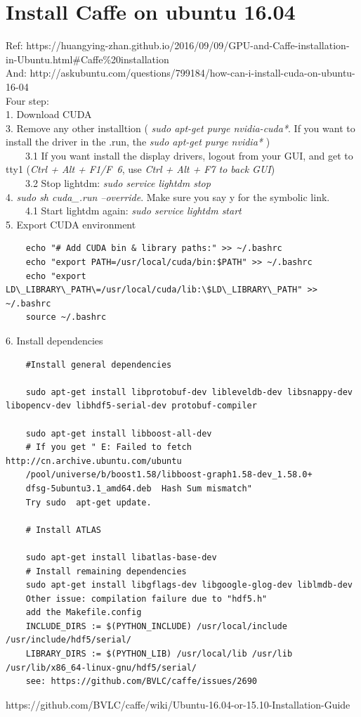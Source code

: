 \documentclass[a4paper, 12pt]{article}
\begin{document}
    \section{Install Caffe on ubuntu 16.04}
    Ref: https://huangying-zhan.github.io/2016/09/09/GPU-and-Caffe-installation-in-Ubuntu.html#Caffe\%20installation\\
    And: http://askubuntu.com/questions/799184/how-can-i-install-cuda-on-ubuntu-16-04\\
    Four step:\\
    1. Download CUDA\\
    3. Remove any other installtion ( \textit{sudo apt-get purge nvidia-cuda*}. If you want to install the driver in the .run, the \textit{sudo apt-get purge nvidia*} )\\
    ~~~~3.1 If you want install the display drivers, logout from your GUI, and get to tty1 (\textit{Ctrl + Alt + F1/F~6}, use \textit{Ctrl + Alt + F7 to back GUI})\\
    ~~~~3.2 Stop lightdm: \textit{sudo service lightdm stop}\\
    4. \textit{sudo sh cuda\_.run --override}. Make sure you say y for the symbolic link.\\
    ~~~~4.1 Start lightdm again: \textit{sudo service lightdm start}\\
    5. Export CUDA environment\\
    \begin{verbatim}
	echo "# Add CUDA bin & library paths:" >> ~/.bashrc
	echo "export PATH=/usr/local/cuda/bin:$PATH" >> ~/.bashrc
	echo "export LD\_LIBRARY\_PATH\=/usr/local/cuda/lib:\$LD\_LIBRARY\_PATH" >> ~/.bashrc
	source ~/.bashrc
    \end{verbatim}
    6. Install dependencies\\
    \begin{verbatim}
    #Install general dependencies

    sudo apt-get install libprotobuf-dev libleveldb-dev libsnappy-dev libopencv-dev libhdf5-serial-dev protobuf-compiler

    sudo apt-get install libboost-all-dev
    # If you get " E: Failed to fetch http://cn.archive.ubuntu.com/ubuntu
    /pool/universe/b/boost1.58/libboost-graph1.58-dev_1.58.0+
    dfsg-5ubuntu3.1_amd64.deb  Hash Sum mismatch"
    Try sudo  apt-get update.

    # Install ATLAS

    sudo apt-get install libatlas-base-dev
    # Install remaining dependencies
    sudo apt-get install libgflags-dev libgoogle-glog-dev liblmdb-dev
    Other issue: compilation failure due to "hdf5.h" 
    add the Makefile.config
    INCLUDE_DIRS := $(PYTHON_INCLUDE) /usr/local/include /usr/include/hdf5/serial/
    LIBRARY_DIRS := $(PYTHON_LIB) /usr/local/lib /usr/lib /usr/lib/x86_64-linux-gnu/hdf5/serial/
    see: https://github.com/BVLC/caffe/issues/2690
    \end{verbatim}
    https://github.com/BVLC/caffe/wiki/Ubuntu-16.04-or-15.10-Installation-Guide
\end{document}
